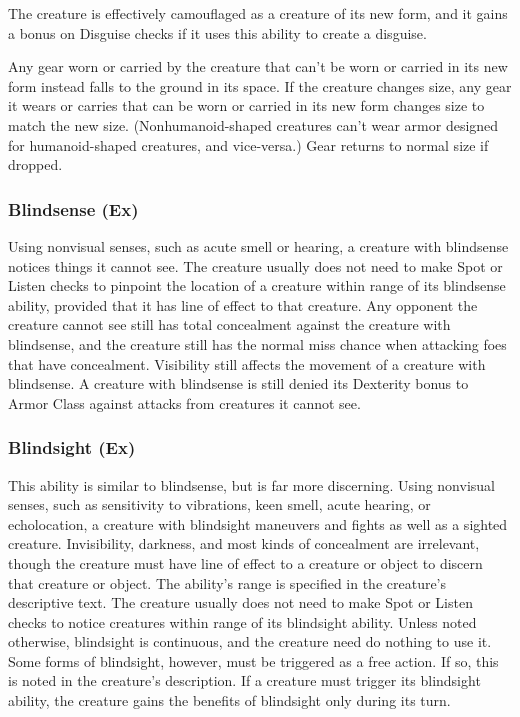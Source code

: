 {\begin{itemize*}
\item The creature is effectively camouflaged as a creature of its new form, and it gains a   bonus on Disguise checks if it uses this ability to create a disguise.
\item Any gear worn or carried by the creature that can't be worn or carried in its new form instead falls to the ground in its space. If the creature changes size, any gear it wears or carries that can be worn or carried in its new form changes size to match the new size. (Nonhumanoid-shaped creatures can't wear armor designed for humanoid-shaped creatures, and vice-versa.) Gear returns to normal size if dropped.
\end{itemize*}

\subsubsection{Blindsense (Ex)} Using nonvisual senses, such as acute smell or hearing, a creature with blindsense notices things it cannot see. The creature usually does not need to make Spot or Listen checks to pinpoint the location of a creature within range of its blindsense ability, provided that it has line of effect to that creature. Any opponent the creature cannot see still has total concealment against the creature with blindsense, and the creature still has the normal miss chance when attacking foes that have concealment. Visibility still affects the movement of a creature with blindsense. A creature with blindsense is still denied its Dexterity bonus  to Armor Class against attacks from creatures it cannot see.

\subsubsection{Blindsight (Ex)} This ability is similar to blindsense, but is far more discerning. Using nonvisual senses, such as sensitivity to vibrations, keen smell, acute hearing, or echolocation, a creature with blindsight maneuvers and fights as well as a sighted creature. Invisibility, darkness, and most kinds of concealment are irrelevant, though the creature must have line of effect to a creature or object to discern that creature or object. The ability's range is specified in the creature's descriptive text. The creature usually does not need to make Spot or Listen checks to notice creatures within range of its blindsight ability. Unless noted otherwise, blindsight is continuous, and the creature need do nothing to use it. Some forms of blindsight, however, must be triggered as a free action. If so, this is noted in the creature's description. If a creature must trigger its blindsight ability, the creature gains the benefits of blindsight only during its turn.

}
